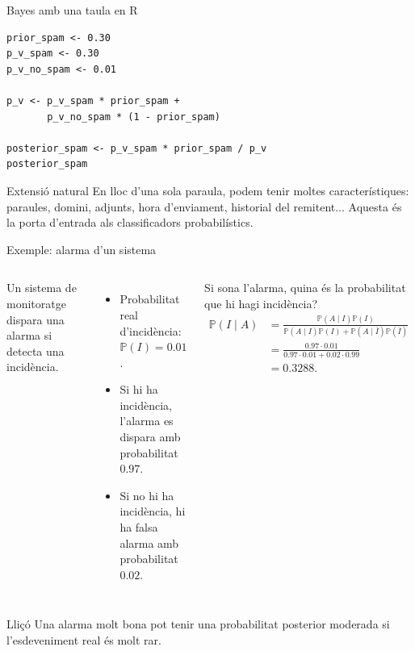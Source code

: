 \documentclass[10pt,aspectratio=169]{beamer}
\newcommand{\Prob}{\mathbb{P}}
\begin{document}
\begin{frame}[fragile]{Bayes amb una taula en R}
\begin{lstlisting}
prior_spam <- 0.30
p_v_spam <- 0.30
p_v_no_spam <- 0.01

p_v <- p_v_spam * prior_spam +
       p_v_no_spam * (1 - prior_spam)

posterior_spam <- p_v_spam * prior_spam / p_v
posterior_spam
\end{lstlisting}
\vspace{0.2cm}
\begin{block}{Extensió natural}
En lloc d'una sola paraula, podem tenir moltes característiques: paraules, domini, adjunts, hora d'enviament, historial del remitent... Aquesta és la porta d'entrada als classificadors probabilístics.
\end{block}
\end{frame}

\begin{frame}{Exemple: alarma d'un sistema}
\begin{columns}[T]
Un sistema de monitoratge dispara una alarma si detecta una incidència.
\begin{itemize}
  \item Probabilitat real d'incidència: $\Prob(I)=0.01$.
  \item Si hi ha incidència, l'alarma es dispara amb probabilitat $0.97$.
  \item Si no hi ha incidència, hi ha falsa alarma amb probabilitat $0.02$.
\end{itemize}
Si sona l'alarma, quina és la probabilitat que hi hagi incidència?
\begin{align*}
\Prob(I\mid A)&=\frac{\Prob(A\mid I)\Prob(I)}{\Prob(A\mid I)\Prob(I)+\Prob(A\mid \overline{I})\Prob(\overline{I})}\\[0.2cm]
&=\frac{0.97\cdot 0.01}{0.97\cdot 0.01+0.02\cdot 0.99}\\[0.2cm]
&=0.3288.
\end{align*}
\end{columns}
\begin{alertblock}{Lliçó}
Una alarma molt bona pot tenir una probabilitat posterior moderada si l'esdeveniment real és molt rar.
\end{alertblock}
\end{frame}
\end{document}
